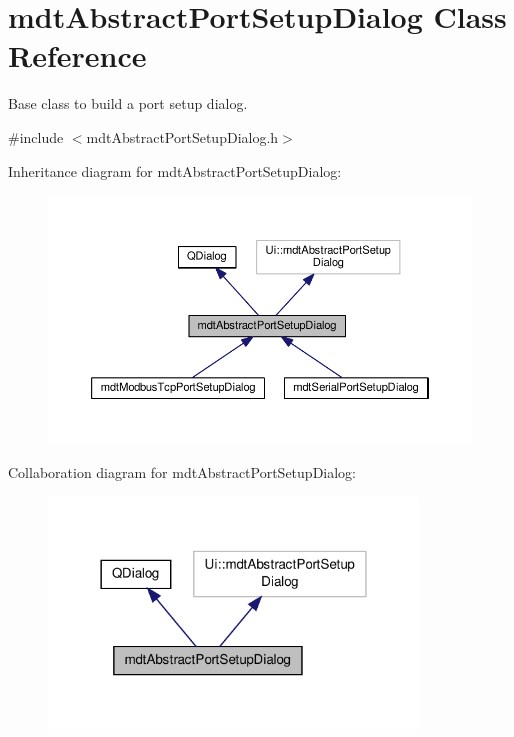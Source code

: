 \hypertarget{classmdt_abstract_port_setup_dialog}{\section{mdt\-Abstract\-Port\-Setup\-Dialog Class Reference}
\label{classmdt_abstract_port_setup_dialog}
}


Base class to build a port setup dialog.  




{\ttfamily \#include $<$mdt\-Abstract\-Port\-Setup\-Dialog.\-h$>$}



Inheritance diagram for mdt\-Abstract\-Port\-Setup\-Dialog\-:
\nopagebreak
\begin{figure}[H]
\begin{center}
\leavevmode
\includegraphics[width=350pt]{classmdt_abstract_port_setup_dialog__inherit__graph}
\end{center}
\end{figure}


Collaboration diagram for mdt\-Abstract\-Port\-Setup\-Dialog\-:\nopagebreak
\begin{figure}[H]
\begin{center}
\leavevmode
\includegraphics[width=278pt]{classmdt_abstract_port_setup_dialog__coll__graph}
\end{center}
\end{figure}
